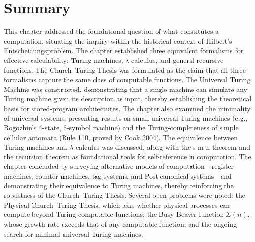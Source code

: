 \section{Summary}
\label{sec:computation:summary}

This chapter addressed the foundational question of what constitutes a computation, situating the inquiry within the historical context of Hilbert's Entscheidungsproblem. The chapter established three equivalent formalisms for effective calculability: Turing machines, $\lambda$-calculus, and general recursive functions. The Church--Turing Thesis was formulated as the claim that all three formalisms capture the same class of computable functions. The Universal Turing Machine was constructed, demonstrating that a single machine can simulate any Turing machine given its description as input, thereby establishing the theoretical basis for stored-program architectures. The chapter also examined the minimality of universal systems, presenting results on small universal Turing machines (e.g., Rogozhin's 4-state, 6-symbol machine) and the Turing-completeness of simple cellular automata (Rule 110, proved by Cook 2004). The equivalence between Turing machines and $\lambda$-calculus was discussed, along with the s-m-n theorem and the recursion theorem as foundational tools for self-reference in computation. The chapter concluded by surveying alternative models of computation---register machines, counter machines, tag systems, and Post canonical systems---and demonstrating their equivalence to Turing machines, thereby reinforcing the robustness of the Church--Turing Thesis. Several open problems were noted: the Physical Church--Turing Thesis, which asks whether physical processes can compute beyond Turing-computable functions; the Busy Beaver function $\Sigma(n)$, whose growth rate exceeds that of any computable function; and the ongoing search for minimal universal Turing machines.

